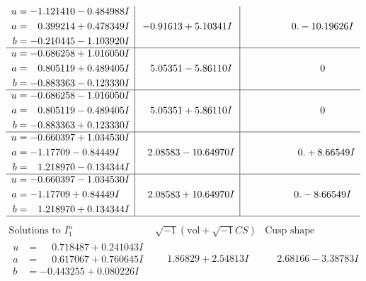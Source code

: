 \documentclass[1p]{elsarticle_modified}
\theoremstyle{definition}
\newcommand{\I}{\sqrt{-1}}
\begin{document}
$$\begin{array}{c|c|c}
\begin{aligned}
u &= -1.121410 - 0.484988 I \\
a &= \phantom{-}0.399214 + 0.478349 I \\
b &= -0.210445 - 1.103920 I\end{aligned}
 & -0.91613 + 5.10341 I & \phantom{-0.000000 } 0. - 10.19626 I \\ \hline\begin{aligned}
u &= -0.686258 + 1.016050 I \\
a &= \phantom{-}0.805119 + 0.489405 I \\
b &= -0.883363 - 0.123330 I\end{aligned}
 & \phantom{-}5.05351 - 5.86110 I & \phantom{-0.000000 } 0 \\ \hline\begin{aligned}
u &= -0.686258 - 1.016050 I \\
a &= \phantom{-}0.805119 - 0.489405 I \\
b &= -0.883363 + 0.123330 I\end{aligned}
 & \phantom{-}5.05351 + 5.86110 I & \phantom{-0.000000 } 0 \\ \hline\begin{aligned}
u &= -0.660397 + 1.034530 I \\
a &= -1.17709 - 0.84449 I \\
b &= \phantom{-}1.218970 - 0.134344 I\end{aligned}
 & \phantom{-}2.08583 - 10.64970 I & \phantom{-0.000000 -}0. + 8.66549 I \\ \hline\begin{aligned}
u &= -0.660397 - 1.034530 I \\
a &= -1.17709 + 0.84449 I \\
b &= \phantom{-}1.218970 + 0.134344 I\end{aligned}
 & \phantom{-}2.08583 + 10.64970 I & \phantom{-0.000000 } 0. - 8.66549 I\\
 \hline 
 \end{array}$$\newpage$$\begin{array}{c|c|c}  
\text{Solutions to }I^u_{1}& \I (\text{vol} + \sqrt{-1}CS) & \text{Cusp shape}\\
 \hline 
\begin{aligned}
u &= \phantom{-}0.718487 + 0.241043 I \\
a &= \phantom{-}0.617067 + 0.760645 I \\
b &= -0.443255 + 0.080226 I\end{aligned}
 & \phantom{-}1.86829 + 2.54813 I & \phantom{-}2.68166 - 3.38783 I \\ \hline\begin{aligned}

\end{aligned}
\end{array}$$
\end{document}
